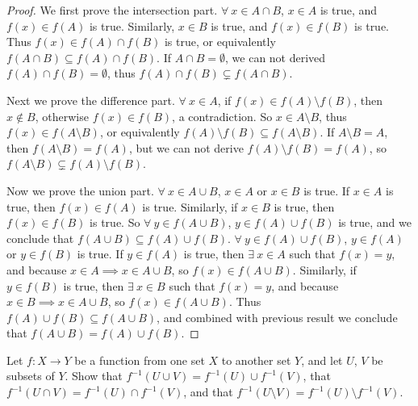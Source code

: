 \begin{proof}
We first prove the intersection part.
\(\forall\ x \in A \cap B\), \(x \in A\) is true, and \(f(x) \in f(A)\) is true.
Similarly, \(x \in B\) is true, and \(f(x) \in f(B)\) is true.
Thus \(f(x) \in f(A) \cap f(B)\) is true, or equivalently \(f(A \cap B) \subseteq f(A) \cap f(B)\).
If \(A \cap B = \emptyset\), we can not derived \(f(A) \cap f(B) = \emptyset\), thus \(f(A) \cap f(B) \subsetneq f(A \cap B)\).

Next we prove the difference part.
\(\forall\ x \in A\), if \(f(x) \in f(A) \setminus f(B)\), then \(x \notin B\), otherwise \(f(x) \in f(B)\), a contradiction.
So \(x \in A \setminus B\), thus \(f(x) \in f(A \setminus B)\), or equivalently \(f(A) \setminus f(B) \subseteq f(A \setminus B)\).
If \(A \setminus B = A\), then \(f(A \setminus B) = f(A)\), but we can not derive \(f(A) \setminus f(B) = f(A)\), so \(f(A \setminus B) \subsetneq f(A) \setminus f(B)\).

Now we prove the union part.
\(\forall\ x \in A \cup B\), \(x \in A\) or \(x \in B\) is true.
If \(x \in A\) is true, then \(f(x) \in f(A)\) is true.
Similarly, if \(x \in B\) is true, then \(f(x) \in f(B)\) is true.
So \(\forall\ y \in f(A \cup B)\), \(y \in f(A) \cup f(B)\) is true, and we conclude that \(f(A \cup B) \subseteq f(A) \cup f(B)\).
\(\forall\ y \in f(A) \cup f(B)\), \(y \in f(A)\) or \(y \in f(B)\) is true.
If \(y \in f(A)\) is true, then \(\exists\ x \in A\) such that \(f(x) = y\), and because \(x \in A \implies x \in A \cup B\), so \(f(x) \in f(A \cup B)\).
Similarly, if \(y \in f(B)\) is true, then \(\exists\ x \in B\) such that \(f(x) = y\), and because \(x \in B \implies x \in A \cup B\), so \(f(x) \in f(A \cup B)\).
Thus \(f(A) \cup f(B) \subseteq f(A \cup B)\), and combined with previous result we conclude that \(f(A \cup B) = f(A) \cup f(B)\).
\end{proof}

\begin{exercise}\label{ex 3.4.4}
Let \(f : X \to Y\) be a function from one set \(X\) to another set \(Y\), and let \(U\), \(V\) be subsets of \(Y\). Show that \(f^{-1}(U \cup V) = f^{-1}(U) \cup f^{-1}(V)\), that
\(f^{-1}(U \cap V) = f^{-1}(U) \cap f^{-1}(V)\), and that \(f^{-1}(U \setminus V) = f^{-1}(U) \setminus f^{-1}(V)\).
\end{exercise}

